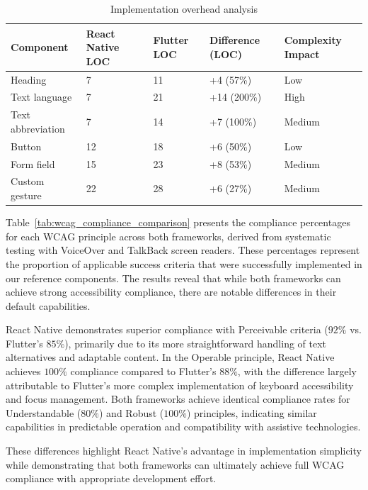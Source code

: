 \begin{table}[ht]
\caption{Implementation overhead analysis}
\label{tab:implementation_overhead_comparison}
\centering
\begin{tabular}{|P{2.5cm}|P{2.5cm}|P{2.5cm}|P{2.5cm}|P{2.5cm}|}
\hline
\textbf{Component} & \textbf{React Native LOC} & \textbf{Flutter LOC} & \textbf{Difference (LOC)} & \textbf{Complexity Impact} \\
\hline
Heading & 7 & 11 & +4 (57\%) & Low \\
\hline
Text language & 7 & 21 & +14 (200\%) & High \\
\hline
Text abbreviation & 7 & 14 & +7 (100\%) & Medium \\
\hline
Button & 12 & 18 & +6 (50\%) & Low \\
\hline
Form field & 15 & 23 & +8 (53\%) & Medium \\
\hline
Custom gesture & 22 & 28 & +6 (27\%) & Medium \\
\hline
\end{tabular}
\end{table}

Table~\ref{tab:wcag_compliance_comparison} presents the compliance percentages for each WCAG principle across both frameworks, derived from systematic testing with VoiceOver and TalkBack screen readers. These percentages represent the proportion of applicable success criteria that were successfully implemented in our reference components. The results reveal that while both frameworks can achieve strong accessibility compliance, there are notable differences in their default capabilities.

React Native demonstrates superior compliance with Perceivable criteria ($92\%$ vs. Flutter's $85\%$), primarily due to its more straightforward handling of text alternatives and adaptable content. In the Operable principle, React Native achieves $100\%$ compliance compared to Flutter's $88\%$, with the difference largely attributable to Flutter's more complex implementation of keyboard accessibility and focus management. Both frameworks achieve identical compliance rates for Understandable ($80\%$) and Robust ($100\%$) principles, indicating similar capabilities in predictable operation and compatibility with assistive technologies.

These differences highlight React Native's advantage in implementation simplicity while demonstrating that both frameworks can ultimately achieve full WCAG compliance with appropriate development effort.


